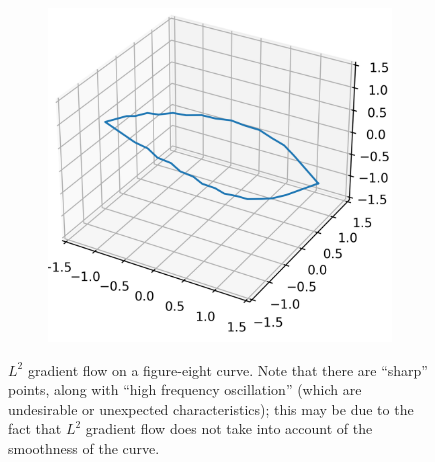 \documentclass[../dissertation.tex]{subfiles}
\begin{document}
\begin{figure}[tbp]
\begin{subfigure}[b]{0.32\textwidth}
    \end{subfigure}
    \begin{subfigure}[b]{0.32\textwidth}
        \centering
        \includegraphics[width=\textwidth]{sections/unknottingCurveImgs/figure8-L2-2}
    \end{subfigure}

    \caption{$L^2$ gradient flow on a figure-eight curve. Note that there are ``sharp'' points, along with ``high frequency oscillation'' (which are undesirable or unexpected characteristics); this may be due to the fact that $L^2$ gradient flow does not take into account of the smoothness of the curve.}
    \label{fig: L2 Curve Unknotting}
\end{figure}
\end{document}
